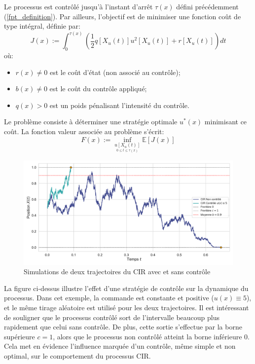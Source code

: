 Le processus est contrôlé jusqu'à l'instant d'arrêt $\tau(x)$ défini précédemment (\ref{fpt_definition}).
Par ailleurs, l'objectif est de minimiser une fonction coût de type intégral, définie par:
\begin{equation}\label{cost_function}
    J(x) := \int_0^{\tau(x)} \left( \frac{1}{2}q[X_u(t)]u^2[X_u(t)] + r[X_u(t)] \right) dt
\end{equation}
où:
\begin{itemize}
    \item \( r(x) \neq 0 \) est le coût d'état (non associé au contrôle);
    \item \( b(x) \neq 0 \) est le coût du contrôle appliqué;
    \item \( q(x) > 0 \) est un poids pénalisant l'intensité du contrôle.
\end{itemize}
Le problème consiste à déterminer une stratégie optimale \( u^*(x) \) minimisant ce coût. La fonction valeur associée au problème s'écrit:
\begin{equation}\label{value_function}
    F(x) := \inf_{\underset{0 \leq t \leq \tau(x)}{u[X_u(t)]}} \mathds{E}[J(x)]
\end{equation}
\begin{figure}[htb]
    \centering
    \includegraphics[width=0.9\linewidth]{img/intro/control.pdf}
    \caption{Simulations de deux trajectoires du CIR avec et sans contrôle}\label{fig:ControlViz}
\end{figure}
\FloatBarrier La figure ci-dessus illustre l'effet d'une stratégie de contrôle sur la dynamique du processus. Dans cet exemple, la commande est constante et positive ($u(x)\equiv5$), et le même tirage aléatoire est utilisé pour les deux trajectoires. Il est intéressant de souligner que le processus contrôlé sort de l'intervalle beaucoup plus rapidement que celui sans contrôle. De plus, cette sortie s'effectue par la borne supérieure \(c = 1\), alors que le processus non contrôlé atteint la borne inférieure 0. Cela met en évidence l'influence marquée d'un contrôle, même simple et non optimal, sur le comportement du processus \acs{CIR}.



